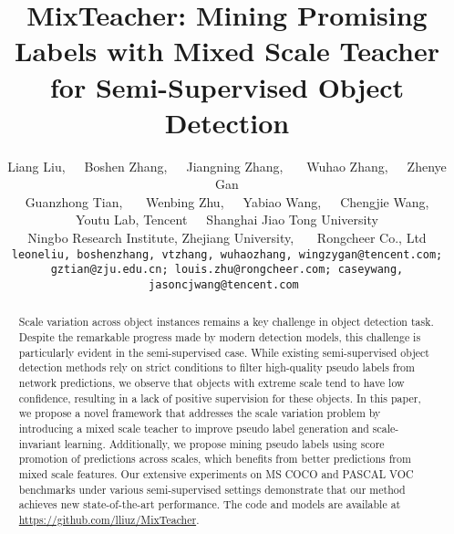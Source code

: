 \documentclass[10pt,twocolumn,letterpaper]{article}
\makeatletter
\def\thanks#1{\protected@xdef\@thanks{\@thanks
        \protect\footnotetext{#1}}}
\makeatother
\begin{document}
\title{MixTeacher: Mining Promising Labels with Mixed Scale Teacher\\ for Semi-Supervised Object Detection}



\author{Liang Liu,~~~Boshen Zhang,~~~Jiangning Zhang, ~~~Wuhao Zhang,~~~Zhenye Gan\\Guanzhong Tian, ~~~Wenbing Zhu,~~~Yabiao Wang\thanks{ Corresponding Authors.},~~~Chengjie Wang, 
\\ 
Youtu Lab, Tencent~~~Shanghai Jiao Tong University\\
Ningbo Research Institute, Zhejiang University, ~~~Rongcheer Co., Ltd\\
\tt\small leoneliu, boshenzhang, vtzhang, wuhaozhang, wingzygan@tencent.com;\\
\tt\small gztian@zju.edu.cn; louis.zhu@rongcheer.com; caseywang, jasoncjwang@tencent.com
}
\maketitle


\begin{abstract}
    Scale variation across object instances remains a key challenge in object detection task. Despite the remarkable progress made by modern detection models, this challenge is particularly evident in the semi-supervised case. While existing semi-supervised object detection methods rely on strict conditions to filter high-quality pseudo labels from network predictions, we observe that objects with extreme scale tend to have low confidence, resulting in a lack of positive supervision for these objects. In this paper, we propose a novel framework that addresses the scale variation problem by introducing a mixed scale teacher to improve pseudo label generation and scale-invariant learning. Additionally, we propose mining pseudo labels using score promotion of predictions across scales, which benefits from better predictions from mixed scale features. Our extensive experiments on MS COCO and PASCAL VOC benchmarks under various semi-supervised settings demonstrate that our method achieves new state-of-the-art performance. The code and models are available at \url{https://github.com/lliuz/MixTeacher}.


   
   
\end{abstract}


\vspace{-1em}
\end{document}
